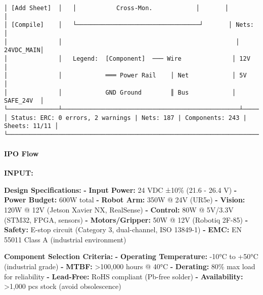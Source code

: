 \documentclass[
]{article}
\newenvironment{Shaded}{\begin{snugshade}}{\end{snugshade}}
\newcommand{\AttributeTok}[1]{\textcolor[rgb]{0.13,0.29,0.53}{#1}}
\newcommand{\FunctionTok}[1]{\textcolor[rgb]{0.13,0.29,0.53}{\textbf{#1}}}
\newcommand{\KeywordTok}[1]{\textcolor[rgb]{0.13,0.29,0.53}{\textbf{#1}}}
\begin{document}
\begin{verbatim}
│ [Add Sheet]  │   │           Cross-Mon.            │       │           │
│ [Compile]    │   └──────────────────────────────────┘       │ Nets:     │
│              │                                                │ 24VDC_MAIN│
│              │   Legend:  [Component]  ─── Wire              │ 12V       │
│              │            ═══ Power Rail    │ Net            │ 5V        │
│              │            GND Ground        ║ Bus            │ SAFE_24V  │
└──────────────┴─────────────────────────────────────────────────┴───────────┘
│ Status: ERC: 0 errors, 2 warnings | Nets: 187 | Components: 243 | Sheets: 11/11 │
└────────────────────────────────────────────────────────────────────────────┘
\end{verbatim}

\hypertarget{ipo-flow-2}{%
\paragraph{IPO Flow}\label{ipo-flow-2}}

\textbf{INPUT:}

\begin{Shaded}
\begin{Highlighting}[]
\FunctionTok{Design Specifications}\KeywordTok{:}
\AttributeTok{  }\KeywordTok{{-}}\AttributeTok{ }\FunctionTok{Input Power}\KeywordTok{:}\AttributeTok{ 24 VDC ±10\% (21.6 {-} 26.4 V)}
\AttributeTok{  }\KeywordTok{{-}}\AttributeTok{ }\FunctionTok{Power Budget}\KeywordTok{:}\AttributeTok{ 600W total}
\AttributeTok{    }\KeywordTok{{-}}\AttributeTok{ }\FunctionTok{Robot Arm}\KeywordTok{:}\AttributeTok{ 350W @ 24V (UR5e)}
\AttributeTok{    }\KeywordTok{{-}}\AttributeTok{ }\FunctionTok{Vision}\KeywordTok{:}\AttributeTok{ 120W @ 12V (Jetson Xavier NX, RealSense)}
\AttributeTok{    }\KeywordTok{{-}}\AttributeTok{ }\FunctionTok{Control}\KeywordTok{:}\AttributeTok{ 80W @ 5V/3.3V (STM32, FPGA, sensors)}
\AttributeTok{    }\KeywordTok{{-}}\AttributeTok{ }\FunctionTok{Motors/Gripper}\KeywordTok{:}\AttributeTok{ 50W @ 12V (Robotiq 2F{-}85)}
\AttributeTok{  }\KeywordTok{{-}}\AttributeTok{ }\FunctionTok{Safety}\KeywordTok{:}\AttributeTok{ E{-}stop circuit (Category 3, dual{-}channel, ISO 13849{-}1)}
\AttributeTok{  }\KeywordTok{{-}}\AttributeTok{ }\FunctionTok{EMC}\KeywordTok{:}\AttributeTok{ EN 55011 Class A (industrial environment)}

\FunctionTok{Component Selection Criteria}\KeywordTok{:}
\AttributeTok{  }\KeywordTok{{-}}\AttributeTok{ }\FunctionTok{Operating Temperature}\KeywordTok{:}\AttributeTok{ {-}10°C to +50°C (industrial grade)}
\AttributeTok{  }\KeywordTok{{-}}\AttributeTok{ }\FunctionTok{MTBF}\KeywordTok{:}\AttributeTok{ \textgreater{}100,000 hours @ 40°C}
\AttributeTok{  }\KeywordTok{{-}}\AttributeTok{ }\FunctionTok{Derating}\KeywordTok{:}\AttributeTok{ 80\% max load for reliability}
\AttributeTok{  }\KeywordTok{{-}}\AttributeTok{ }\FunctionTok{Lead{-}Free}\KeywordTok{:}\AttributeTok{ RoHS compliant (Pb{-}free solder)}
\AttributeTok{  }\KeywordTok{{-}}\AttributeTok{ }\FunctionTok{Availability}\KeywordTok{:}\AttributeTok{ \textgreater{}1,000 pcs stock (avoid obsolescence)}
\end{Highlighting}
\end{Shaded}
\end{document}
